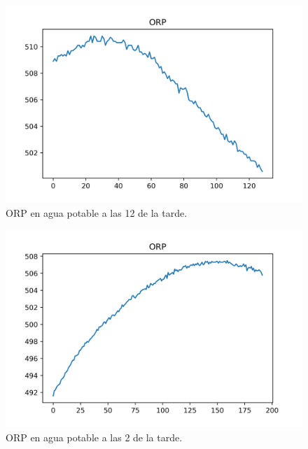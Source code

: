 \begin{figure}[h]
	\centering
	\includegraphics[scale=0.7]{imgss162.png}
	\caption{ORP en agua potable a las 12 de la tarde.}
	\label{fig:figura1000_9}
\end{figure}

\clearpage

\begin{figure}[h]
	\centering
	\includegraphics[scale=0.7]{imgss163.png}
	\caption{ORP en agua potable a las 2 de la tarde.}
	\label{fig:figura1000_10}
\end{figure}

